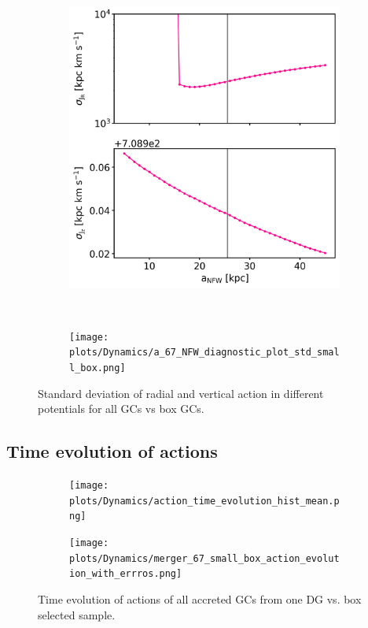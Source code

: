 \begin{figure}[htbp]
    \begin{subfigure}[b]{0.45\textwidth}
    \centering
    	\includegraphics[width=\textwidth]{plots/Dynamics/prog2/a_NFW_diagnostic_plot_std_prog2_all.png}
    	\label{fig:NFW_diag_all_GCs}
    \end{subfigure}
    ~ %
    \begin{subfigure}[b]{0.45\textwidth}
        \centering
    	\texttt{[image: plots/Dynamics/a\_67\_NFW\_diagnostic\_plot\_std\_small\_box.png]}
	    \label{fig:NFW_diag_box_GCs}
    \end{subfigure}
    \caption{Standard deviation of radial and vertical action in different potentials for all \acp{GC} vs box \acp{GC}.}\label{fig:NFW_diagnostics}
\end{figure}

\subsection{Time evolution of actions}
\begin{figure}[htbp]
    \begin{subfigure}[b]{0.5\textwidth}
    \centering
    	\texttt{[image: plots/Dynamics/action\_time\_evolution\_hist\_mean.png]}
    	\label{fig:time_ev_all_GCs}
    \end{subfigure}
    \begin{subfigure}[b]{0.5\textwidth}
        \centering
    	\texttt{[image: plots/Dynamics/merger\_67\_small\_box\_action\_evolution\_with\_errros.png]}
	    \label{fig:time_ev_box_GCs}
    \end{subfigure}
    \caption{Time evolution of actions of all accreted \acp{GC} from one \ac{DG} vs. box selected sample.}\label{fig:actions_time_evolution}
\end{figure}
